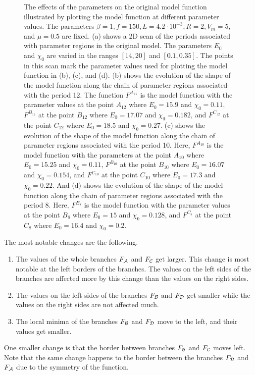 \begin{figure}
{		\label{fig:setup.char.evolution.08}
	}
	\caption[The effects of the parameters on the original model function]{
		The effects of the parameters on the original model function illustrated by plotting the model function at different parameter values.
		The parameters $\beta = 1, f = 150, L = 4.2 \cdot 10^{-3}, R = 2, V_m = 5,$ and $\mu = 0.5$ are fixed.
		(a) shows a 2D scan of the periods associated with parameter regions in the original model.
		The parameters $E_0$ and $\chi_0$ are varied in the ranges $[14, 20]$ and $[0.1, 0.35]$.
		The points in this scan mark the parameter values used for plotting the model function in (b), (c), and (d).
		(b) shows the evolution of the shape of the model function along the chain of parameter regions associated with the period 12.
		The function $F^{A_{12}}$ is the model function with the parameter values at the point $A_{12}$ where $E_0 = 15.9$ and $\chi_0 = 0.11$,
		$F^{B_{12}}$ at the point $B_{12}$ where $E_0 = 17.07$ and $\chi_0 = 0.182$,
		and $F^{C_{12}}$ at the point $C_{12}$ where $E_0 = 18.5$ and $\chi_0 = 0.27$.
		(c) shows the evolution of the shape of the model function along the chain of parameter regions associated with the period 10.
		Here, $F^{A_{10}}$ is the model function with the parameters at the point $A_{10}$ where $E_0 = 15.25$ and $\chi_0 = 0.11$,
		$F^{B_{10}}$ at the point $B_{10}$ where $E_0 = 16.07$ and $\chi_0 = 0.154$,
		and $F^{C_{10}}$ at the point $C_{10}$ where $E_0 = 17.3$ and $\chi_0 = 0.22$.
		And (d) shows the evolution of the shape of the model function along the chain of parameter regions associated with the period 8.
		Here, $F^{B_8}$ is the model function with the parameter values at the point $B_8$ where $E_0 = 15$ and $\chi_0 = 0.128$,
		and $F^{C_8}$ at the point $C_8$ where $E_0 = 16.4$ and $\chi_0 = 0.2$.
	}
	\label{fig:setup.char.evolution.combined}
\end{figure}

The most notable changes are the following.
\begin{enumerate}
	\item The values of the whole branches $F_{\mathcal{A}}$ and $F_{\mathcal{C}}$ get larger.
	      This change is most notable at the left borders of the branches.
	      The values on the left sides of the branches are affected more by this change than the values on the right sides.
	\item The values on the left sides of the branches $F_{\mathcal{B}}$ and $F_{\mathcal{D}}$ get smaller while the values on the right sides are not affected much.
	\item The local minima of the branches $F_{\mathcal{B}}$ and $F_{\mathcal{D}}$ move to the left, and their values get smaller.
\end{enumerate}
One smaller change is that the border between branches $F_{\mathcal{B}}$ and $F_{\mathcal{C}}$ moves left.
Note that the same change happens to the border between the branches $F_{\mathcal{D}}$ and $F_{\mathcal{A}}$ due to the symmetry of the function.

